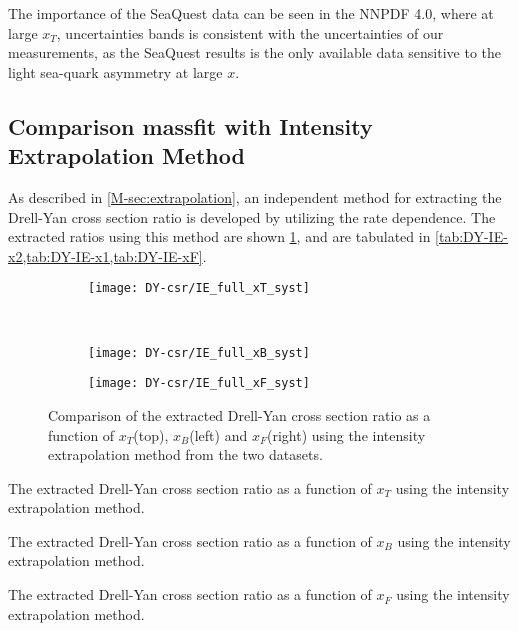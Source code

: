 \documentclass[../main.tex]{subfiles}
\begin{document}
The importance of the SeaQuest data can be seen in the NNPDF 4.0, where at large $x_T$,
uncertainties bands is consistent with the uncertainties of our measurements, as the SeaQuest
results is the only available data sensitive to the light sea-quark asymmetry at large $x$.


\subsection{Comparison massfit with Intensity Extrapolation Method}
As described in \cref{M-sec:extrapolation}, an independent method for extracting the Drell-Yan cross section
ratio is developed by utilizing the rate dependence. The extracted ratios using this method are shown \cref{fig:CSR_IE},
and are tabulated in \cref{tab:DY-IE-x2,tab:DY-IE-x1,tab:DY-IE-xF}.
\begin{figure}[h!]
	\centering
	\begin{subfigure}{0.6\linewidth}
		\texttt{[image: DY-csr/IE\_full\_xT\_syst]}
	\end{subfigure}\\
	\begin{subfigure}{0.45\linewidth}
		\texttt{[image: DY-csr/IE\_full\_xB\_syst]}
	\end{subfigure}
	\begin{subfigure}{0.45\linewidth}
		\texttt{[image: DY-csr/IE\_full\_xF\_syst]}
	\end{subfigure}
	\caption{Comparison of the extracted Drell-Yan cross section ratio as a function of $x_T$(top),
		$x_B$(left) and $x_F$(right) using the intensity extrapolation method from the two datasets.}
	\label{fig:CSR_IE}
\end{figure}

\begin{table}[h!]
	\centering
	\caption{The extracted Drell-Yan cross section ratio as a function of $x_T$ using the intensity extrapolation method.}
	\label{tab:DY-IE-x2}
	
\end{table}
\begin{table}[h!]
	\centering
	\caption{The extracted Drell-Yan cross section ratio as a function of $x_B$ using the intensity extrapolation method.}
	\label{tab:DY-IE-x1}
	
\end{table}
\begin{table}[h!]
	\centering
	\caption{The extracted Drell-Yan cross section ratio as a function of $x_F$ using the intensity extrapolation method.}
	\label{tab:DY-IE-xF}
	
\end{table}
\FloatBarrier
\end{document}
